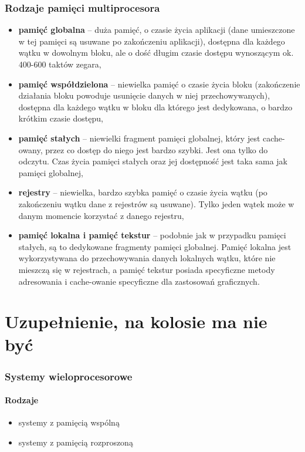 \documentclass[a4paper,twoside]{article}
\begin{document}
		\section*{Rodzaje pamięci multiprocesora}
		\begin{itemize}
			\item \textbf{pamięć globalna} – duża pamięć, o czasie życia aplikacji (dane umieszczone w tej pamięci są usuwane po zakończeniu aplikacji), dostępna dla każdego wątku w dowolnym bloku, ale o dość długim czasie dostępu wynoszącym ok. 400-600 taktów zegara,
			\item \textbf{pamięć współdzielona} – niewielka pamięć o czasie życia bloku (zakończenie działania bloku powoduje usunięcie danych w niej przechowywanych), dostępna dla każdego wątku w bloku dla którego jest dedykowana, o bardzo krótkim czasie dostępu,
			\item \textbf{pamięć stałych} – niewielki fragment pamięci globalnej, który jest cache-owany, przez co dostęp do niego jest bardzo szybki. Jest ona tylko do odczytu. Czas życia pamięci stałych oraz jej dostępność jest taka sama jak pamięci globalnej,
			\item \textbf{rejestry} – niewielka, bardzo szybka pamięć o czasie życia wątku (po zakończeniu wątku dane z rejestrów są usuwane). Tylko jeden wątek może w danym momencie korzystać z danego rejestru,
			\item \textbf{pamięć lokalna i pamięć tekstur} – podobnie jak w przypadku pamięci stałych, są to dedykowane fragmenty pamięci globalnej. Pamięć lokalna jest wykorzystywana do przechowywania danych lokalnych wątku, które nie mieszczą się w rejestrach, a pamięć tekstur posiada specyficzne metody adresowania i cache-owanie specyficzne dla zastosowań graficznych.
		\end{itemize}
		
\part*{Uzupełnienie, na kolosie ma nie być}
	\section*{Systemy wieloprocesorowe}
		\subsection*{Rodzaje}
		\begin{itemize}
			\item systemy z pamięcią wspólną
			\item systemy z pamięcią rozproszoną
		\end{itemize}
\end{document}
